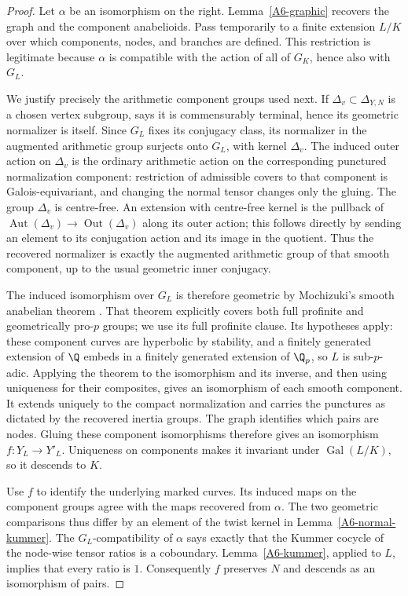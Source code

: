 \begin{proof}
Let $\alpha$ be an isomorphism on the right. Lemma~\ref{A6-graphic} recovers the graph and the component anabelioids. Pass temporarily to a finite extension $L/K$ over which components, nodes, and branches are defined. This restriction is legitimate because $\alpha$ is compatible with the action of all of $G_K$, hence also with $G_L$.

We justify precisely the arithmetic component groups used next. If $\Delta_v\subset\Delta_{Y,N}$ is a chosen vertex subgroup, \cite[Proposition 1.2(ii)]{Mochizuki2007A567} says it is commensurably terminal, hence its geometric normalizer is itself. Since $G_L$ fixes its conjugacy class, its normalizer in the augmented arithmetic group surjects onto $G_L$, with kernel $\Delta_v$. The induced outer action on $\Delta_v$ is the ordinary arithmetic action on the corresponding punctured normalization component: restriction of admissible covers to that component is Galois-equivariant, and changing the normal tensor changes only the gluing. The group $\Delta_v$ is centre-free. An extension with centre-free kernel is the pullback of $\operatorname{Aut}(\Delta_v)\to\operatorname{Out}(\Delta_v)$ along its outer action; this follows directly by sending an element to its conjugation action and its image in the quotient. Thus the recovered normalizer is exactly the augmented arithmetic group of that smooth component, up to the usual geometric inner conjugacy.

The induced isomorphism over $G_L$ is therefore geometric by Mochizuki's smooth anabelian theorem \cite[Theorem A, equivalently Theorem 16.5]{Mochizuki1999A567}. That theorem explicitly covers both full profinite and geometrically pro-$p$ groups; we use its full profinite clause. Its hypotheses apply: these component curves are hyperbolic by stability, and a finitely generated extension of $\Q$ embeds in a finitely generated extension of $\Q_p$, so $L$ is sub-$p$-adic. Applying the theorem to the isomorphism and its inverse, and then using uniqueness for their composites, gives an isomorphism of each smooth component. It extends uniquely to the compact normalization and carries the punctures as dictated by the recovered inertia groups. The graph identifies which pairs are nodes. Gluing these component isomorphisms therefore gives an isomorphism $f:Y_L\to Y'_L$. Uniqueness on components makes it invariant under $\operatorname{Gal}(L/K)$, so it descends to $K$.

Use $f$ to identify the underlying marked curves. Its induced maps on the component groups agree with the maps recovered from $\alpha$. The two geometric comparisons thus differ by an element of the twist kernel in Lemma~\ref{A6-normal-kummer}. The $G_L$-compatibility of $\alpha$ says exactly that the Kummer cocycle of the node-wise tensor ratios is a coboundary. Lemma~\ref{A6-kummer}, applied to $L$, implies that every ratio is $1$. Consequently $f$ preserves $N$ and descends as an isomorphism of pairs.


\end{proof}
